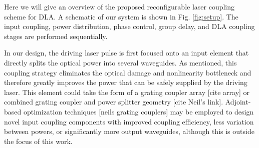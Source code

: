 \documentclass[%
 reprint,
 amsmath,amssymb,
 aps,
prstab,
floatfix,
]{revtex4-1}
\begin{document}
Here we will give an overview of the proposed reconfigurable laser coupling scheme for DLA.  A schematic of our system is shown in Fig. \ref{fig:setup}. The input coupling, power distribution, phase control, group delay, and DLA coupling stages are performed sequentially.

In our design, the driving laser pulse is first focused onto an input element that directly splits the optical power into several waveguides.  As mentioned, this coupling strategy eliminates the optical damage and nonlinearity bottleneck and therefore greatly improves the power that can be safely supplied by the driving laser. This element could take the form of a grating coupler array [cite array] or combined grating coupler and power splitter geometry [cite Neil's link].  Adjoint-based optimization techniques [neils grating couplers] may be employed to design novel input coupling components with improved coupling efficiency, less variation between powers, or significantly more output waveguides, although this is outside the focus of this work.
\end{document}
